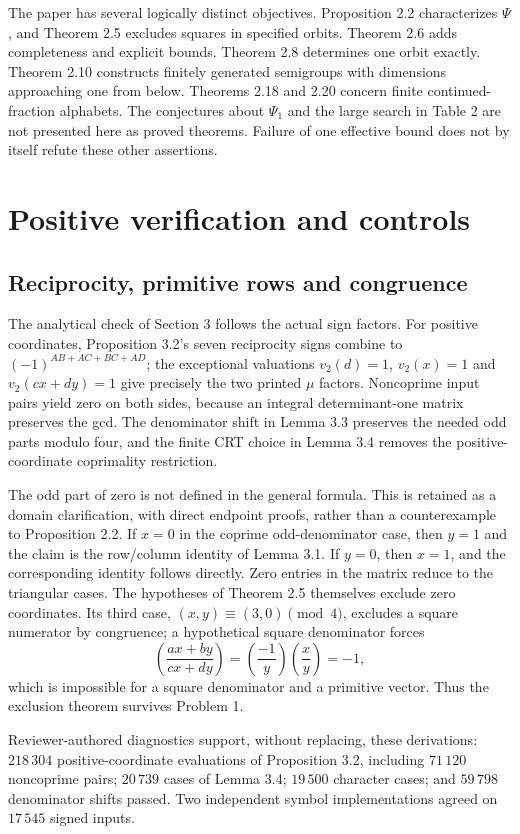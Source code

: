 \documentclass[10pt]{article}
\begin{document}
The paper has several logically distinct objectives. Proposition 2.2 characterizes \(\Psi\), and Theorem 2.5 excludes squares in specified orbits. Theorem 2.6 adds completeness and explicit bounds. Theorem 2.8 determines one orbit exactly. Theorem 2.10 constructs finitely generated semigroups with dimensions approaching one from below. Theorems 2.18 and 2.20 concern finite continued-fraction alphabets. The conjectures about \(\Psi_1\) and the large search in Table 2 are not presented here as proved theorems. Failure of one effective bound does not by itself refute these other assertions.\par
\section*{Positive verification and controls}
\subsection*{Reciprocity, primitive rows and congruence}
The analytical check of Section 3 follows the actual sign factors. For positive coordinates, Proposition 3.2’s seven reciprocity signs combine to \((-1)^{AB+AC+BC+AD}\); the exceptional valuations \(v_2(d)=1\), \(v_2(x)=1\) and \(v_2(cx+dy)=1\) give precisely the two printed \(\mu\) factors. Noncoprime input pairs yield zero on both sides, because an integral determinant-one matrix preserves the gcd. The denominator shift in Lemma 3.3 preserves the needed odd parts modulo four, and the finite CRT choice in Lemma 3.4 removes the positive-coordinate coprimality restriction.\par
The odd part of zero is not defined in the general formula. This is retained as a domain clarification, with direct endpoint proofs, rather than a counterexample to Proposition 2.2. If \(x=0\) in the coprime odd-denominator case, then \(y=1\) and the claim is the row/column identity of Lemma 3.1. If \(y=0\), then \(x=1\), and the corresponding identity follows directly. Zero entries in the matrix reduce to the triangular cases. The hypotheses of Theorem 2.5 themselves exclude zero coordinates. Its third case, \((x,y)\equiv(3,0)\pmod4\), excludes a square numerator by congruence; a hypothetical square denominator forces \[\left(\frac{ax+by}{cx+dy}\right)
   =\left(\frac{-1}{y}\right)\left(\frac{x}{y}\right)=-1,\] which is impossible for a square denominator and a primitive vector. Thus the exclusion theorem survives Problem 1.\par
Reviewer-authored diagnostics support, without replacing, these derivations: \(218\,304\) positive-coordinate evaluations of Proposition 3.2, including \(71\,120\) noncoprime pairs; \(20\,739\) cases of Lemma 3.4; \(19\,500\) character cases; and \(59\,798\) denominator shifts passed. Two independent symbol implementations agreed on \(17\,545\) signed inputs.\par
\end{document}
